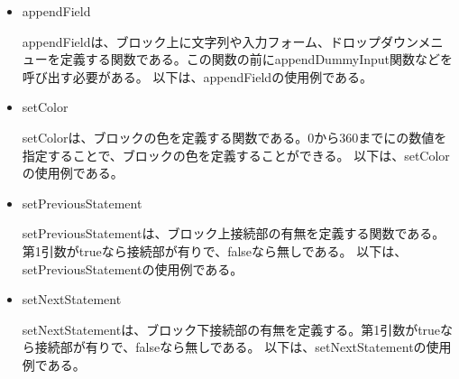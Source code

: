 \documentclass{risepaper}
\begin{document}
\begin{itemize}

\item appendField

appendFieldは、ブロック上に文字列や入力フォーム、ドロップダウンメニューを定義する関数である。この関数の前にappendDummyInput関数などを呼び出す必要がある。
以下は、appendFieldの使用例である。


\item setColor

setColorは、ブロックの色を定義する関数である。0から360までにの数値を指定することで、ブロックの色を定義することができる。
以下は、setColorの使用例である。


\item setPreviousStatement

setPreviousStatementは、ブロック上接続部の有無を定義する関数である。第1引数がtrueなら接続部が有りで、falseなら無しである。
以下は、setPreviousStatementの使用例である。


\item setNextStatement

setNextStatementは、ブロック下接続部の有無を定義する。第1引数がtrueなら接続部が有りで、falseなら無しである。
以下は、setNextStatementの使用例である。



\end{itemize}
\end{document}
